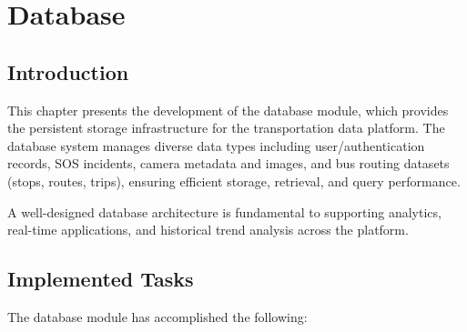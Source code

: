 \chapter{Database}
\label{chap:database}

\section{Introduction}

This chapter presents the development of the database module, which provides the persistent storage infrastructure for the transportation data platform. The database system manages diverse data types including user/authentication records, SOS incidents, camera metadata and images, and bus routing datasets (stops, routes, trips), ensuring efficient storage, retrieval, and query performance.

A well-designed database architecture is fundamental to supporting analytics, real-time applications, and historical trend analysis across the platform.

\section{Implemented Tasks}

The database module has accomplished the following:

